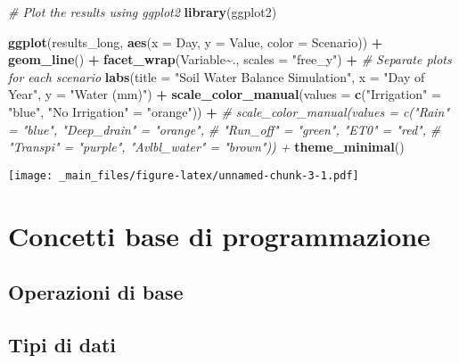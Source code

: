 \documentclass[
]{book}
\newenvironment{Shaded}{\begin{snugshade}}{\end{snugshade}}
\newcommand{\AttributeTok}[1]{\textcolor[rgb]{0.13,0.29,0.53}{#1}}
\newcommand{\CommentTok}[1]{\textcolor[rgb]{0.56,0.35,0.01}{\textit{#1}}}
\newcommand{\FunctionTok}[1]{\textcolor[rgb]{0.13,0.29,0.53}{\textbf{#1}}}
\newcommand{\NormalTok}[1]{#1}
\newcommand{\OtherTok}[1]{\textcolor[rgb]{0.56,0.35,0.01}{#1}}
\newcommand{\SpecialCharTok}[1]{\textcolor[rgb]{0.81,0.36,0.00}{\textbf{#1}}}
\newcommand{\StringTok}[1]{\textcolor[rgb]{0.31,0.60,0.02}{#1}}
\theoremstyle{definition}
\theoremstyle{definition}
\theoremstyle{definition}
\theoremstyle{definition}
\theoremstyle{remark}
\begin{document}
\begin{Shaded}
\begin{Highlighting}[]
\CommentTok{\# Plot the results using ggplot2}
\FunctionTok{library}\NormalTok{(ggplot2)}

\FunctionTok{ggplot}\NormalTok{(results\_long, }\FunctionTok{aes}\NormalTok{(}\AttributeTok{x =}\NormalTok{ Day, }\AttributeTok{y =}\NormalTok{ Value, }\AttributeTok{color =}\NormalTok{ Scenario)) }\SpecialCharTok{+}
  \FunctionTok{geom\_line}\NormalTok{() }\SpecialCharTok{+}
  \FunctionTok{facet\_wrap}\NormalTok{(Variable}\SpecialCharTok{\textasciitilde{}}\NormalTok{., }\AttributeTok{scales =} \StringTok{"free\_y"}\NormalTok{) }\SpecialCharTok{+}  \CommentTok{\# Separate plots for each scenario}
  \FunctionTok{labs}\NormalTok{(}\AttributeTok{title =} \StringTok{"Soil Water Balance Simulation"}\NormalTok{, }\AttributeTok{x =} \StringTok{"Day of Year"}\NormalTok{, }\AttributeTok{y =} \StringTok{"Water (mm)"}\NormalTok{) }\SpecialCharTok{+}
  \FunctionTok{scale\_color\_manual}\NormalTok{(}\AttributeTok{values =} \FunctionTok{c}\NormalTok{(}\StringTok{"Irrigation"} \OtherTok{=} \StringTok{"blue"}\NormalTok{, }\StringTok{"No Irrigation"} \OtherTok{=} \StringTok{"orange"}\NormalTok{)) }\SpecialCharTok{+}
  \CommentTok{\# scale\_color\_manual(values = c("Rain" = "blue", "Deep\_drain" = "orange", }
    \CommentTok{\#                            "Run\_off" = "green", "ET0" = "red", }
    \CommentTok{\#                           "Transpi" = "purple", "Avlbl\_water" = "brown")) +}
  \FunctionTok{theme\_minimal}\NormalTok{()}
\end{Highlighting}
\end{Shaded}

\texttt{[image: \_main\_files/figure-latex/unnamed-chunk-3-1.pdf]}

\hypertarget{concetti-base-di-programmazione}{%
\chapter{Concetti base di programmazione}\label{concetti-base-di-programmazione}}

\hypertarget{operazioni-di-base}{%
\section{Operazioni di base}\label{operazioni-di-base}}

\hypertarget{tipi-di-dati}{%
\section{Tipi di dati}\label{tipi-di-dati}}
\end{document}

